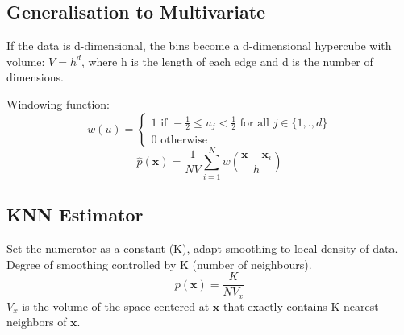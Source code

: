 \subsection*{Generalisation to Multivariate}
If the data is d-dimensional, the bins become a d-dimensional hypercube with volume: $V=h^d$, where h is the length of each edge 
and d is the number of dimensions.

Windowing function:\\
\[w(u) = \begin{cases}
    1 \text{ if } -\frac{1}{2} \leq u_j < \frac{1}{2} \text{ for all } j \in \{1,.,d\}\\
    0 \text{ otherwise}
\end{cases}\]
\[\hat{p}(\mathbf{x})=\frac{1}{NV}\sum^N_{i=1}w(\frac{\mathbf{x} - \mathbf{x}_i}{h})\]


\subsection*{KNN Estimator}
Set the numerator as a constant (K), adapt smoothing to 
local density of data. Degree of smoothing controlled by K (number of neighbours).
\[p(\mathbf{x}) = \frac{K}{NV_x}\]
$V_x$ is the volume of the space centered at $\mathbf{x}$ that exactly contains K nearest 
neighbors of $\mathbf{x}$.\\\\

